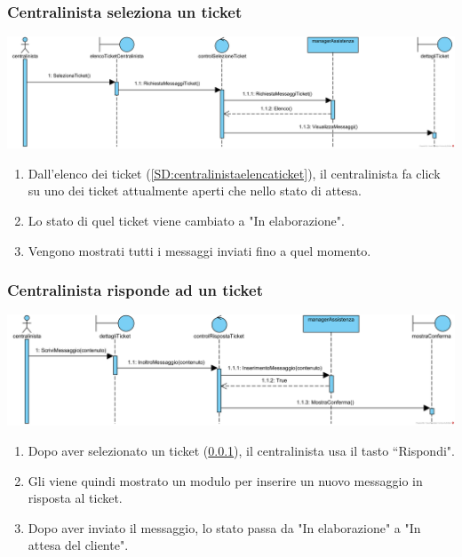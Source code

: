 \documentclass[12pt,a4paper]{article}
\begin{document}
\subsubsection{Centralinista seleziona un ticket}
\label{SD:selezioneticketcentralinista}

\begin{center}
\includegraphics[width=\textwidth]{SequenceDiagram/CentralinistaTicketSeleziona}
\end{center}

\begin{enumerate}
\item Dall'elenco dei ticket (\ref{SD:centralinistaelencaticket}), il centralinista fa click su uno dei ticket attualmente aperti che nello stato di attesa.
\item Lo stato di quel ticket viene cambiato a "In elaborazione".
\item Vengono mostrati tutti i messaggi inviati fino a quel momento.
\end{enumerate}

\newpage

\subsubsection{Centralinista risponde ad un ticket}
\label{SD:rispostaticketcentralinista}

\begin{center}
\includegraphics[width=\textwidth]{SequenceDiagram/CentralinistaTicketRisponde}
\end{center}

\begin{enumerate}
\item Dopo aver selezionato un ticket (\ref{SD:selezioneticketcentralinista}), il centralinista usa il tasto ``Rispondi".
\item Gli viene quindi mostrato un modulo per inserire un nuovo messaggio in risposta al ticket.
\item Dopo aver inviato il messaggio, lo stato passa da "In elaborazione" a "In attesa del cliente".
\end{enumerate}
\end{document}
